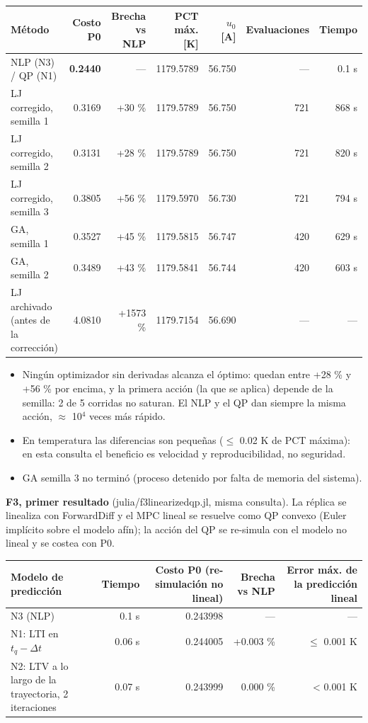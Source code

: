 \documentclass[11pt,a4paper]{article}
\newcommand{\codeus}{\textunderscore\allowbreak}
\newcommand{\code}[1]{{\small\ttfamily\let\_\codeus #1}}
\begin{document}
{\footnotesize
\begin{xltabular}{\linewidth}{@{}YRRRRRR@{}}
\toprule
\textbf{Método} & \textbf{Costo P0} & \textbf{Brecha vs NLP} & \textbf{PCT máx. [K]} & \textbf{$u_0$ [A]} & \textbf{Evaluaciones} & \textbf{Tiempo} \\
\midrule
\endhead
NLP (N3) / QP (N1) & \textbf{0.2440} & — & 1179.5789 & 56.750 & — & 0.1 s \\
LJ corregido, semilla 1 & 0.3169 & +30 \% & 1179.5789 & 56.750 & 721 & 868 s \\
LJ corregido, semilla 2 & 0.3131 & +28 \% & 1179.5789 & 56.750 & 721 & 820 s \\
LJ corregido, semilla 3 & 0.3805 & +56 \% & 1179.5970 & 56.730 & 721 & 794 s \\
GA, semilla 1 & 0.3527 & +45 \% & 1179.5815 & 56.747 & 420 & 629 s \\
GA, semilla 2 & 0.3489 & +43 \% & 1179.5841 & 56.744 & 420 & 603 s \\
LJ archivado (antes de la corrección) & 4.0810 & +1573 \% & 1179.7154 & 56.690 & — & — \\
\bottomrule
\end{xltabular}}

\begin{itemize}
\item Ningún optimizador sin derivadas alcanza el óptimo: quedan entre +28 \% y +56 \% por encima, y la primera acción (la que se aplica) depende de la semilla: 2 de 5 corridas no saturan. El NLP y el QP dan siempre la misma acción, $\approx$ 10$^{4}$ veces más rápido.
\item En temperatura las diferencias son pequeñas ($\le$ 0.02 K de PCT máxima): en esta consulta el beneficio es velocidad y reproducibilidad, no seguridad.
\item GA semilla 3 no terminó (proceso detenido por falta de memoria del sistema).
\end{itemize}

\textbf{F3, primer resultado} (\code{julia/f3\_linearized\_qp.jl}, misma consulta). La réplica se linealiza con ForwardDiff y el MPC lineal se resuelve como QP convexo (Euler implícito sobre el modelo afín); la acción del QP se re-simula con el modelo no lineal y se costea con P0.

{\footnotesize
\begin{xltabular}{\linewidth}{@{}YRRRR@{}}
\toprule
\textbf{Modelo de predicción} & \textbf{Tiempo} & \textbf{Costo P0 (re-simulación no lineal)} & \textbf{Brecha vs NLP} & \textbf{Error máx. de la predicción lineal} \\
\midrule
\endhead
N3 (NLP) & 0.1 s & 0.243998 & — & — \\
N1: LTI en $t_q-\Delta t$ & 0.06 s & 0.244005 & +0.003 \% & $\le$ 0.001 K \\
N2: LTV a lo largo de la trayectoria, 2 iteraciones & 0.07 s & 0.243999 & 0.000 \% & < 0.001 K \\
\bottomrule
\end{xltabular}}
\end{document}
